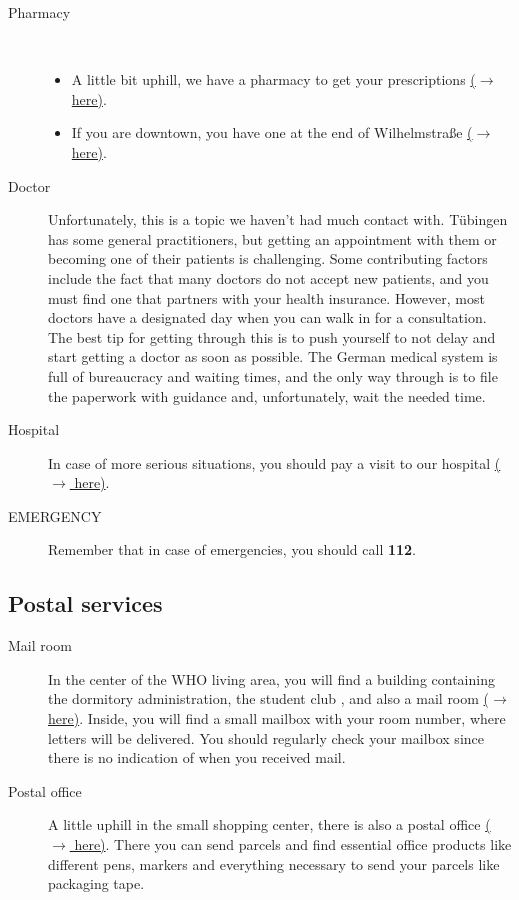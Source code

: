 \begin{description}
    \item[Pharmacy] \ \
        \begin{itemize}
            \item A little bit uphill, we have a pharmacy to get your prescriptions \href{https://maps.app.goo.gl/cpDLc9VZ7XukpgS18}{($\xrightarrow{}$ here)}.
            \item If you are downtown, you have one at the end of Wilhelmstraße \href{https://maps.app.goo.gl/YXwvVpp81eTSZeJW7}{($\xrightarrow{}$ here)}.
        \end{itemize}
  
    \item[Doctor]
        Unfortunately, this is a topic we haven’t had much contact with. Tübingen has some general practitioners, but getting an appointment with them or becoming one of their patients is challenging. Some contributing factors include the fact that many doctors do not accept new patients, and you must find one that partners with your health insurance. However, most doctors have a designated day when you can walk in for a consultation. The best tip for getting through this is to push yourself to not delay and start getting a doctor as soon as possible. The German medical system is full of bureaucracy and waiting times, and the only way through is to file the paperwork with guidance and, unfortunately, wait the needed time.   
        
    \item[Hospital]
        In case of more serious situations, you should pay a visit to our hospital \href{https://maps.app.goo.gl/EHyduztd2QgxTVer9}{($\xrightarrow{}$ here)}.

    \item[EMERGENCY]
    Remember that in case of emergencies, you should call \textbf{112}.
\end{description}

\subsection{Postal services}
\begin{description}
    \item[Mail room]
    In the center of the WHO living area, you will find a building containing the dormitory administration, the student club , and also a mail room \href{https://maps.app.goo.gl/W9UtqfhE1LJJ5oGH8}{($\xrightarrow{}$ here)}. Inside, you will find a small mailbox with your room number, where letters will be delivered. You should regularly check your mailbox since there is no indication of when you received mail.
    \item[Postal office]
    A little uphill in the small  shopping center, there is also a postal office \href{https://maps.app.goo.gl/nMnEheHexNQ5NZY37}{($\xrightarrow{}$ here)}. There you can send parcels and find essential office products like different pens, markers and everything necessary to send your parcels like packaging tape.
\end{description}

